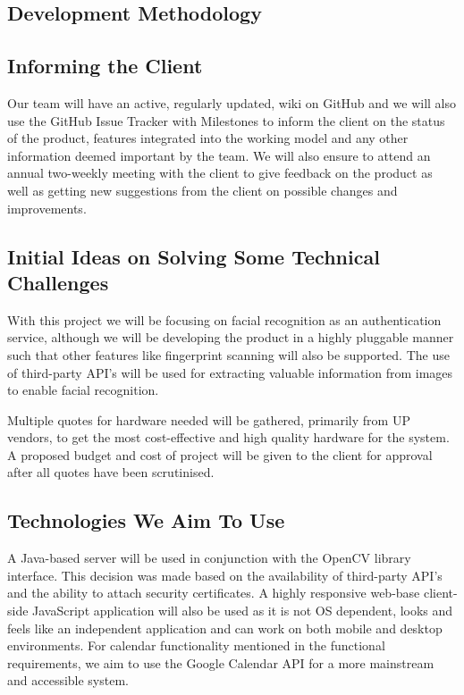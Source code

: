 \subsection{Development Methodology}


\subsection{Informing the Client}
Our team will have an active, regularly updated, wiki on GitHub and we will also use the GitHub Issue Tracker with Milestones to inform the client on the status of the product, features integrated into the working model and any other information deemed important by the team. We will also ensure to attend an annual two-weekly meeting with the client to give feedback on the product as well as getting new suggestions from the client on possible changes and improvements.

\subsection{Initial Ideas on Solving Some Technical Challenges}
With this project we will be focusing on facial recognition as an authentication service, although we will be developing the product in a highly pluggable manner such that other features like fingerprint scanning will also be supported. The use of third-party API’s will be used for extracting valuable information from images to enable facial recognition.

Multiple quotes for hardware needed will be gathered, primarily from UP vendors, to get the most cost-effective and high quality hardware for the system. A proposed budget and cost of project will be given to the client for approval after all quotes have been scrutinised.

\subsection{Technologies We Aim To Use}
A Java-based server will be used in conjunction with the OpenCV library interface. This decision was made based on the availability of third-party API’s and the ability to attach security certificates.
A highly responsive web-base client-side JavaScript application will also be used as it is not OS dependent, looks and feels like an independent application and can work on both mobile and desktop environments. For calendar functionality mentioned in the functional requirements, we aim to use the Google Calendar API for a more mainstream and accessible system.

